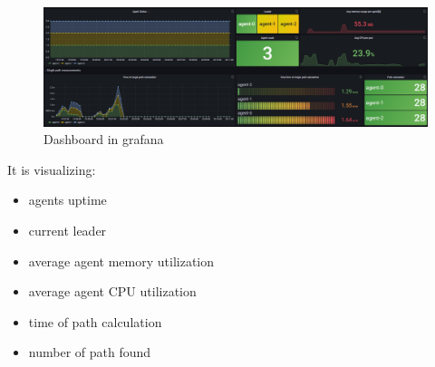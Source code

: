 \begin{figure}[H]
    \centering
    \includegraphics[width=\textwidth]{pictures/grafana.png}
    \caption{ Dashboard in grafana }
    \label{fig:dashboard_grafana}
\end{figure}

It is visualizing:
\begin{itemize}
    \item agents uptime
    \item current leader
    \item average agent memory utilization
    \item average agent CPU utilization
    \item time of path calculation
    \item number of path found
\end{itemize}

